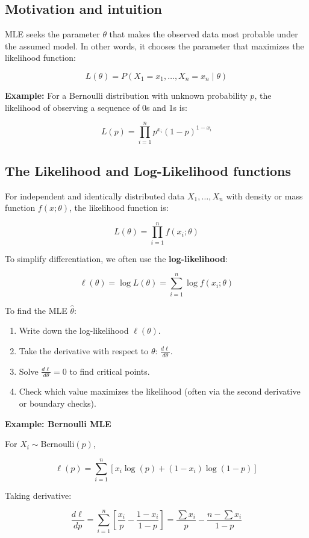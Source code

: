 \documentclass{book}
\begin{document}
\subsection{Motivation and intuition}
MLE seeks the parameter $\theta$ that makes the observed data most probable under the assumed model. In other words, it chooses the parameter that maximizes the likelihood function:

\[
L(\theta) = P(X_1 = x_1, \dots, X_n = x_n \mid \theta)
\]

\textbf{Example:} For a Bernoulli distribution with unknown probability $p$, the likelihood of observing a sequence of 0s and 1s is:

\[
L(p) = \prod_{i=1}^{n} p^{x_i}(1-p)^{1 - x_i}
\]

\subsection{The Likelihood and Log-Likelihood functions}

For independent and identically distributed data $X_1, \dots, X_n$ with density or mass function $f(x; \theta)$, the likelihood function is:

\[
L(\theta) = \prod_{i=1}^{n} f(x_i; \theta)
\]

To simplify differentiation, we often use the \textbf{log-likelihood}:

\[
\ell(\theta) = \log L(\theta) = \sum_{i=1}^{n} \log f(x_i; \theta)
\]

To find the MLE $\hat{\theta}$:

\begin{enumerate}
    \item Write down the log-likelihood $\ell(\theta)$.
    \item Take the derivative with respect to $\theta$: $\frac{d\ell}{d\theta}$.
    \item Solve $\frac{d\ell}{d\theta} = 0$ to find critical points.
    \item Check which value maximizes the likelihood (often via the second derivative or boundary checks).
\end{enumerate}

\textbf{Example: Bernoulli MLE}

For $X_i \sim \text{Bernoulli}(p)$,

\[
\ell(p) = \sum_{i=1}^{n} \left[x_i \log(p) + (1 - x_i)\log(1 - p)\right]
\]

Taking derivative:

\[
\frac{d\ell}{dp} = \sum_{i=1}^{n} \left[\frac{x_i}{p} - \frac{1 - x_i}{1 - p}\right] = \frac{\sum x_i}{p} - \frac{n - \sum x_i}{1 - p}
\]
\end{document}
